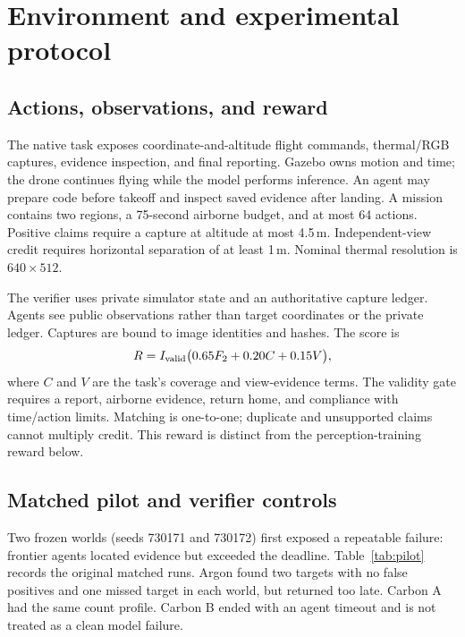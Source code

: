\documentclass[10pt,a4paper,twocolumn]{article}
\begin{document}
\section{Environment and experimental protocol}
\subsection{Actions, observations, and reward}
The native task exposes coordinate-and-altitude flight commands, thermal/RGB captures, evidence inspection, and final reporting. Gazebo owns motion and time; the drone continues flying while the model performs inference. An agent may prepare code before takeoff and inspect saved evidence after landing. A mission contains two regions, a 75-second airborne budget, and at most 64 actions. Positive claims require a capture at altitude at most 4.5\,m. Independent-view credit requires horizontal separation of at least 1\,m. Nominal thermal resolution is $640\times512$.

The verifier uses private simulator state and an authoritative capture ledger. Agents see public observations rather than target coordinates or the private ledger. Captures are bound to image identities and hashes. The score is
\[
R=I_{\rm valid}\bigl(0.65F_2+0.20C+0.15V\bigr),
\]
where $C$ and $V$ are the task's coverage and view-evidence terms. The validity gate requires a report, airborne evidence, return home, and compliance with time/action limits. Matching is one-to-one; duplicate and unsupported claims cannot multiply credit. This reward is distinct from the perception-training reward below.

\subsection{Matched pilot and verifier controls}
Two frozen worlds (seeds 730171 and 730172) first exposed a repeatable failure: frontier agents located evidence but exceeded the deadline. Table~\ref{tab:pilot} records the original matched runs. Argon found two targets with no false positives and one missed target in each world, but returned too late. Carbon A had the same count profile. Carbon B ended with an agent timeout and is not treated as a clean model failure.

\begin{table}[ht]\centering\small\caption{Frozen-world pilot. Asterisk denotes an agent timeout; remaining rows are clean terminal runs.}\label{tab:pilot}\end{table}
\end{document}
